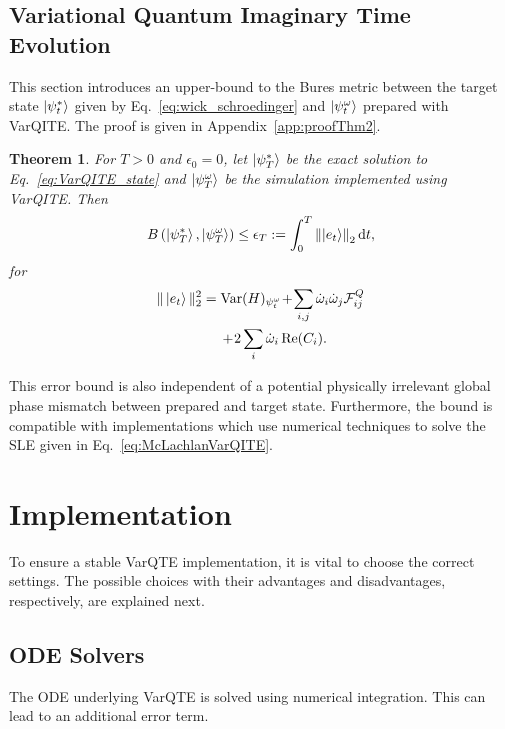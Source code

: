 \documentclass[twocolumn, aps, pra, superscriptaddress]{revtex4-1}
\newtheorem{theorem}{Theorem}
\DeclareMathOperator{\Var}{Var}
\DeclareMathOperator{\R}{Re}
\newcommand{\norm}[1]{\left\lVert#1\right\rVert}
\newcommand*{\di}{\mathrm{d}} %
\begin{document}
\subsection{Variational Quantum Imaginary Time Evolution}
\label{subsec:error_qite}
This section introduces an upper-bound to the Bures metric between the target state $\ket{\psi^*_t}$ given by Eq.~\eqref{eq:wick_schroedinger} and $\ket{\psi^{\omega}_t}$ prepared with VarQITE.
The proof is given in Appendix~\ref{app:proofThm2}.
\begin{theorem} \label{thm_VQITE}
For $T>0$ and $\epsilon_0=0$, let $\ket{\psi^*_T}$ be the exact solution to Eq.~\eqref{eq:VarQITE_state} and $\ket{\psi^{\omega}_T}$ be the simulation implemented using VarQITE.  Then
\begin{align}
 B\left(\ket{\psi^*_T}, \ket{\psi^{\omega}_T}\right) \leq \epsilon_T :=\int_{0}^{T} \norm{\ket{e_t}}_2 \di t,
\end{align}
for 
\begin{align}
\|\ket{e_{t}}\|^2_2 
&= \Var(H)_{\psi^{\omega}_t} \!+\! \sum_{i,j}\dot \omega_i \dot \omega_j \mathcal{F}^Q_{ij} \nonumber \\ 
    &\hspace{5mm}\!+\! 2\sum_i\dot\omega_i \R (C_i). 
 \label{eq:varqite_error_grad}
\end{align}
\end{theorem}
This error bound is also independent of a potential physically irrelevant global phase mismatch between prepared and target state. Furthermore, the bound is compatible with  implementations which use numerical techniques to solve the SLE given in Eq.~\eqref{eq:McLachlanVarQITE}.


\section{Implementation}
\label{sec:methods}
To ensure a stable VarQTE implementation, it is vital to choose the correct settings. The possible choices with their advantages and disadvantages, respectively, are explained next.

\subsection{ODE Solvers}
\label{sec:odesolvers}
The ODE underlying VarQTE is solved using numerical integration. This can lead to an additional error term. 
\end{document}
